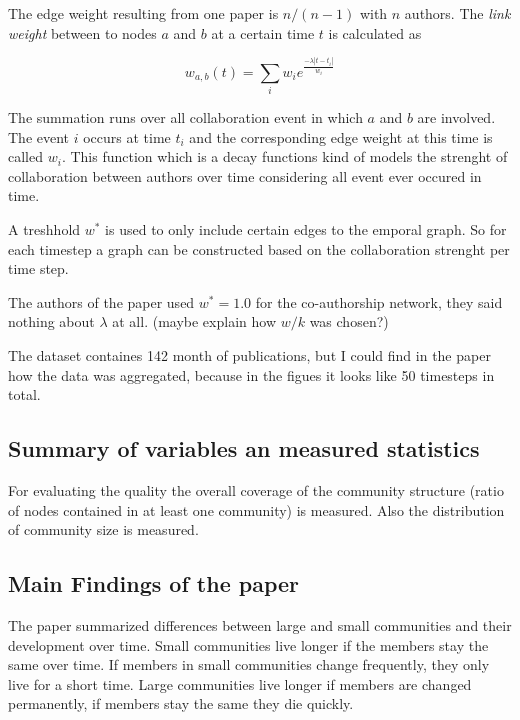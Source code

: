 \documentclass[runningheads,a4paper]{llncs}
\begin{document}
The edge weight resulting from one paper is $n/(n-1)$ with $n$ authors. The \emph{link weight} between to nodes $a$ and $b$ at a certain time $t$ is calculated as

$$w_{a,b}(t)= \sum_{i}^{} w_i e^{\frac{-\lambda \left|t-t_i\right|}{w_i}}$$

The summation runs over all collaboration event in which $a$ and $b$ are involved. The event $i$ occurs at time $t_i$ and the corresponding edge weight at this time is called $w_i$. This function which is a decay functions kind of models the strenght of collaboration between authors over time considering all event ever occured in time.

A treshhold $w^*$ is used to only include certain edges to the emporal graph. So for each timestep a graph can be constructed based on the collaboration strenght per time step.

The authors of the paper used $w^*=1.0$ for the co-authorship network, they said nothing about $\lambda$ at all. (maybe explain how $w/k$ was chosen?)

The dataset containes 142 month of publications, but I could find in the paper how the data was aggregated, because in the figues it looks like 50 timesteps in total.

\subsection{Summary of variables an measured statistics}
\label{evolution-vars}
For evaluating the quality the overall coverage of the community structure (ratio of nodes contained in at least one community) is measured. Also the distribution of community size is measured.

\subsection{Main Findings of the paper}
\label{evolution-findings}
The paper summarized differences between large and small communities and their development over time. Small communities live longer if the members stay the same over time. If members in small communities change frequently, they only live for a short time. Large communities live longer if members are changed permanently, if members stay the same they die quickly.
\end{document}
